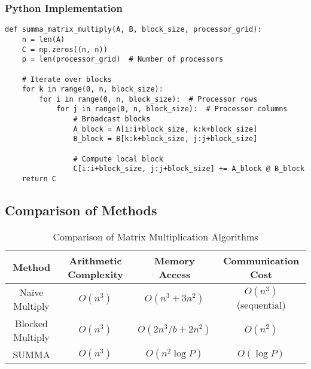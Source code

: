 \documentclass[12pt,a4paper]{article}
\begin{document}
\subsubsection{Python Implementation}
\begin{lstlisting}
def summa_matrix_multiply(A, B, block_size, processor_grid):
    n = len(A)
    C = np.zeros((n, n))
    p = len(processor_grid)  # Number of processors
    
    # Iterate over blocks
    for k in range(0, n, block_size):
        for i in range(0, n, block_size):  # Processor rows
            for j in range(0, n, block_size):  # Processor columns
                # Broadcast blocks
                A_block = A[i:i+block_size, k:k+block_size]
                B_block = B[k:k+block_size, j:j+block_size]
                
                # Compute local block
                C[i:i+block_size, j:j+block_size] += A_block @ B_block
    return C
\end{lstlisting}

\subsection{Comparison of Methods}
\begin{table}[h!]
\centering
\begin{tabular}{|c|c|c|c|}
\hline
\textbf{Method} & \textbf{Arithmetic Complexity} & \textbf{Memory Access} & \textbf{Communication Cost} \\ \hline
Naïve Multiply & $O(n^3)$ & $O(n^3 + 3n^2)$ & $O(n^3)$ (sequential) \\ \hline
Blocked Multiply & $O(n^3)$ & $O(2n^3/b + 2n^2)$ & $O(n^2)$ \\ \hline
SUMMA & $O(n^3)$ & $O(n^2 \log P)$ & $O(\log P)$ \\ \hline
\end{tabular}
\caption{Comparison of Matrix Multiplication Algorithms}
\end{table}
\end{document}
